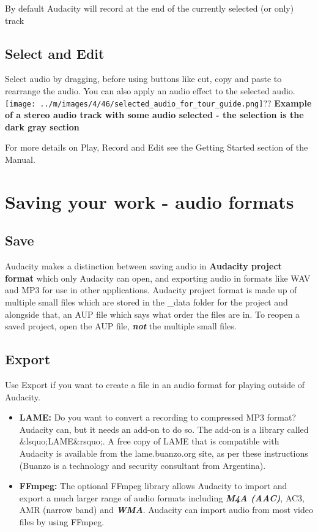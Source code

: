 \documentclass[twocolumn]{book}
\begin{document}
By default Audacity will record at the end of the currently selected (or only) track

\subsection{Select and Edit}


Select audio by dragging, before using buttons like cut, copy and paste to rearrange the audio.  You can also apply an audio effect to the selected audio.\texttt{[image: ../m/images/4/46/selected\_audio\_for\_tour\_guide.png]}??
\textbf{Example of a stereo audio track with some audio selected - the selection is the dark gray section}

For more details on Play, Record and Edit see the Getting Started section of the Manual.




\section{Saving your work - audio formats}


\subsection{Save}


Audacity makes a distinction between saving audio in \textbf{Audacity project format} which only Audacity can open, and exporting audio in formats like WAV and MP3 for use in other applications. Audacity project format is made up of multiple small files which are stored in the \_data folder for the project and alongside that, an  AUP file which says what order the files are in. To reopen a saved project, open the AUP file, \textit{\textbf{not}} the multiple small files. 

\subsection{Export}


Use Export if you want to create a file in an audio format for playing outside of Audacity.
\begin{itemize}
\item  \textbf{LAME:} Do you want to convert a recording to compressed MP3 format? Audacity can, but it needs an add-on to do so.  The add-on is a library called \&lsquo;LAME\&rsquo;.  A free copy of LAME that is compatible with Audacity is available from the   lame.buanzo.org site, as per these instructions (Buanzo is a technology and security consultant from Argentina). 
\item  \textbf{FFmpeg:} The optional FFmpeg library allows Audacity to import and export a much larger range of audio formats including \textit{\textbf{M4A (AAC)}}, AC3, AMR (narrow band) and \textit{\textbf{WMA}}. Audacity can import audio from most video files by using FFmpeg.
\end{itemize}
\end{document}
